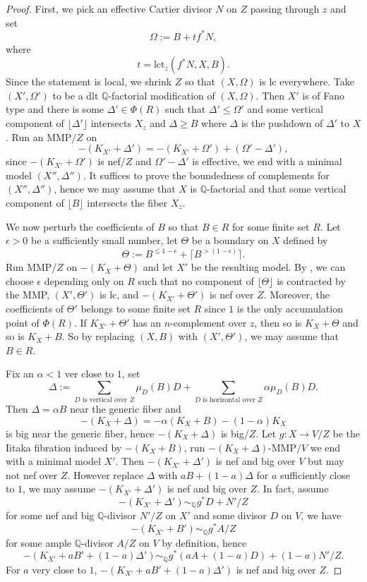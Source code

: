 \documentclass[10pt,a4paper]{amsart}
\begin{document}
\begin{proof}
    First, we pick an effective Cartier divisor $N$ on $Z$ passing through $z$ and set \[\Omega:=B+tf^*N,\] where \[t=\text{lct}_z(f^*N,X,B).\]  Since the statement is local, we shrink $Z$ so that $(X,\Omega)$ is lc everywhere. Take $(X',\Omega')$ to be a dlt ${\mathbb Q}$-factorial modification of $(X,\Omega)$. Then $X'$ is of Fano type and there is some $\Delta'\in\Phi(R)$ such that $\Delta'\leq\Omega'$ and some vertical component of $\lfloor\Delta'\rfloor$ intersects $X_z$ and $\Delta\geq B$ where $\Delta$ is the pushdown of $\Delta'$ to $X$. Run an MMP$/Z$ on \[-(K_{X'}+\Delta')=-(K_{X'}+\Omega')+(\Omega'-\Delta'),\] since $-(K_{X'}+\Omega')$ is nef$/Z$ and $\Omega'-\Delta'$ is effective, we end with a minimal model $(X'',\Delta'')$. It suffices to prove the boundedness of complements for $(X'',\Delta'')$, hence we may assume that $X$ is ${\mathbb Q}$-factorial and that some vertical component of $\lfloor B\rfloor$ intersects the fiber $X_z$.
    
    We now perturb the coefficients of $B$ so that $B\in R$ for some finite set $R$. Let $\epsilon>0$ be a sufficiently small number, let $\Theta$ be a boundary on $X$ defined by
    \[\Theta:=B^{\leq 1-\epsilon}+\lceil B^{>(1-\epsilon)}\rceil.\]
    Run MMP$/Z$ on $-(K_X+\Theta)$ and let $X'$ be the resulting model. By , we can choose $\epsilon$ depending only on $R$ such that no component of $\lfloor\Theta\rfloor$ is contracted by the MMP, $(X',\Theta')$ is lc, and $-(K_{X'}+\Theta')$ is nef over $Z$. Moreover, the coefficients of $\Theta'$ belongs to some finite set $R$ since $1$ is the only accumulation point of $\Phi(R)$. If $K_{X'}+\Theta'$ has an $n$-complement over $z$, then so is $K_X+\Theta$ and so is $K_X+B$.  So by replacing $(X,B)$ with $(X',\Theta')$, we may assume that $B\in R$.  
    
    Fix an $\alpha<1$ ver close to $1$, set \[\Delta:=\sum
    \limits_{D\text{ is vertical over }Z}\mu_D(B)D+\sum\limits_{D\text{ is horizontal over }Z}\alpha\mu_D(B)D.\] Then $\Delta=\alpha B$ near the generic fiber and \[-(K_X+\Delta)=-\alpha(K_X+B)-(1-\alpha)K_X\] is big near the generic fiber, hence $-(K_X+\Delta)$ is big$/Z$. Let $g:X\to V/Z$ be the Iitaka fibration induced by $-(K_X+B)$, run $-(K_X+\Delta)$-MMP$/V$ we end with a minimal model $X'$. Then $-(K_{X'}+\Delta')$ is nef and big over $V$ but may not nef over $Z$. However replace $\Delta$ with $aB+(1-a)\Delta$ for $a$ sufficiently close to $1$, we may assume $-(K_{X'}+\Delta')$ is nef and big over $Z$. In fact, assume \[-(K_{X'}+\Delta')\sim_{\mathbb Q} g^*D+N'/Z\] for some nef and big ${\mathbb Q}$-divisor $N'/Z$ on $X'$ and some divisor $D$ on $V$, we have \[-(K_{X'}+B')\sim_{\mathbb Q}g^*A/Z\] for some ample ${\mathbb Q}$-divisor $A/Z$ on $V$ by definition, hence \[-(K_{X'}+aB'+(1-a)\Delta')\sim_{\mathbb Q}g^*(aA+(1-a)D)+(1-a)N'/Z.\] For $a$ very close to $1$, $-(K_{X'}+aB'+(1-a)\Delta')$ is nef and big over $Z$. 
    

\end{proof}
\end{document}
